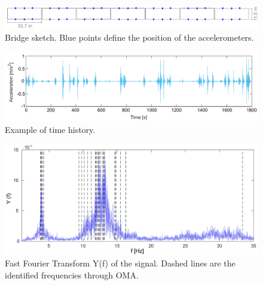 \documentclass{article}
\begin{document}
\begin{figure}[H]
    \centering
    \includegraphics[width=1\textwidth]{Figures/bridge_sketch_downey.pdf}
    \caption{Bridge sketch. Blue points define the position of the accelerometers.}
\end{figure}
\begin{figure}[H]
    \centering
    \includegraphics[width=1\textwidth]{Figures/timehistories_downey.pdf}
    \caption{Example of time history.}
\end{figure}
\begin{figure}[H]
    \centering
    \includegraphics[width=1\textwidth]{Figures/fft_downey.pdf}
    \caption{Fast Fourier Transform Y(f) of the signal. Dashed lines are the identified frequencies through OMA.}
\end{figure}
\end{document}
